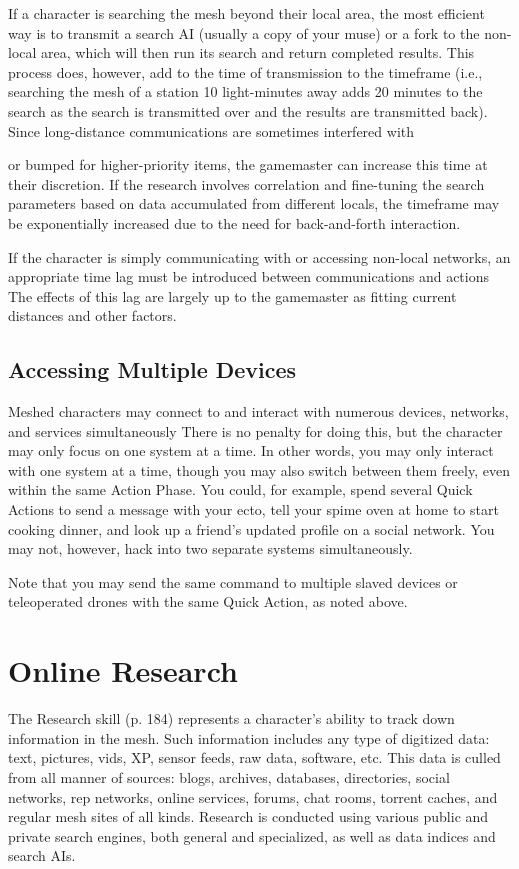 If a character is searching the mesh beyond their local area, the most efficient way is to transmit a search AI (usually a copy of your muse) or a fork to the non-local area, which will then run its search and return completed results. This process does, however, add to the time of transmission to the timeframe (i.e., searching the mesh of a station 10 light-minutes away adds 20 minutes to the search as the search is transmitted over and the results are transmitted back). Since long-distance communications are sometimes interfered with 

or bumped for higher-priority items, the gamemaster can increase this time at their discretion. If the research involves correlation and fine-tuning the search parameters based on data accumulated from different locals, the timeframe may be exponentially increased due to the need for back-and-forth interaction. 

If the character is simply communicating with or accessing non-local networks, an appropriate time lag must be introduced between communications and actions The effects of this lag are largely up to the gamemaster as fitting current distances and other factors. 

\subsection{Accessing Multiple Devices} 

Meshed characters may connect to and interact with numerous devices, networks, and services simultaneously There is no penalty for doing this, but the character may only focus on one system at a time. In other words, you may only interact with one system at a time, though you may also switch between them freely, even within the same Action Phase. You could, for example, spend several Quick Actions to send a message with your ecto, tell your spime oven at home to start cooking dinner, and look up a friend's updated profile on a social network. You may not, however, hack into two separate systems simultaneously. 

Note that you may send the same command to multiple slaved devices or teleoperated drones with the same Quick Action, as noted above. 

\section{Online Research} 

The Research skill (p. 184) represents a character's ability to track down information in the mesh. Such information includes any type of digitized data: text, pictures, vids, XP, sensor feeds, raw data, software, etc. This data is culled from all manner of sources: blogs, archives, databases, directories, social networks, rep networks, online services, forums, chat rooms, torrent caches, and regular mesh sites of all kinds. Research is conducted using various public and private search engines, both general and specialized, as well as data indices and search AIs. 

